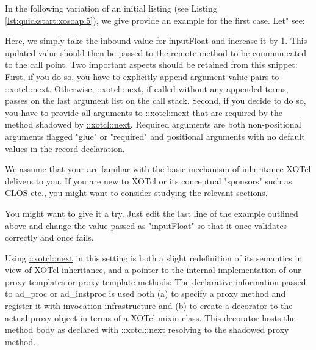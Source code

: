 %
In the following variation of an initial listing (see Listing \ref{lst:quickstart:xosoap:5}), we give provide an 
example for the first case. Let" see:
%

%
Here, we simply take the inbound value for inputFloat and increase it by 1. This updated value should 
then be passed to the remote method to be communicated to the call point. Two important aspects 
should be retained from this snippet: First, if you do so, you have to explicitly append argument-value 
pairs to \href{http://media.wu-wien.ac.at/doc/tutorial.html#class_method_chaining}{::xotcl::next}. Otherwise, \href{http://media.wu-wien.ac.at/doc/tutorial.html#class_method_chaining}{::xotcl::next}, if called without any appended terms, passes on the last 
argument list on the call stack. Second, if you decide to do so, you have to provide all arguments 
to \href{http://media.wu-wien.ac.at/doc/tutorial.html#class_method_chaining}{::xotcl::next} that are required by the method shadowed by \href{http://media.wu-wien.ac.at/doc/tutorial.html#class_method_chaining}{::xotcl::next}. Required arguments are both 
non-positional arguments flagged "glue" or "required" and positional arguments with no default values in 
the record declaration.
%
\begin{hints}
\item We assume that your are familiar with the basic mechanism of inheritance XOTcl delivers to you. If 
you are new to XOTcl or its conceptual "sponsors" such as CLOS etc., you might want to consider 
studying the relevant sections.
\item You might want to give it a try. Just edit the last line of the example outlined above and change the 
value passed as "inputFloat" so that it once validates correctly and once fails.
\end{hints}
%
Using \href{http://media.wu-wien.ac.at/doc/tutorial.html#class_method_chaining}{::xotcl::next} in this setting is both a slight redefinition of its semantics in view of XOTcl inheritance, 
and a pointer to the internal implementation of our proxy templates or proxy template methods: The 
declarative information passed to ad\_proc or ad\_instproc is used both (a) to specify a proxy method 
and register it with invocation infrastructure and (b) to create a decorator to the actual proxy object in 
terms of a XOTcl mixin class. This decorator hosts the method body as declared with \href{http://media.wu-wien.ac.at/doc/tutorial.html#class_method_chaining}{::xotcl::next} 
resolving to the shadowed proxy method.

